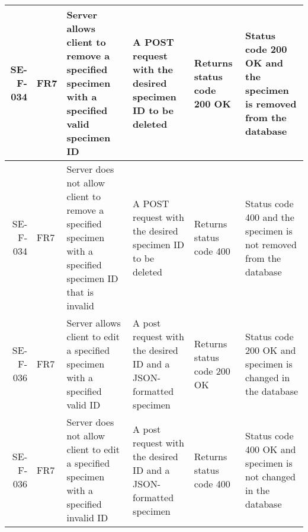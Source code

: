 \begin{landscape}
\begin{longtable}{|r|l|p{4cm}|p{4cm}|p{4cm}|p{4cm}|}
		SE-F-034 & FR7 & Server allows client to remove a specified specimen with a specified valid specimen ID &  A POST request with the desired specimen ID to be deleted &  Returns status code 200 OK &  Status code 200 OK and the specimen is removed from the database \\ \hline
		SE-F-034 & FR7 & Server does not allow client to remove a specified specimen with a specified specimen ID that is invalid&  A POST request with the desired specimen ID to be deleted &  Returns status code 400 &  Status code 400 and the specimen is not removed from the database \\ \hline
		SE-F-036 & FR7 & Server allows client to edit a specified specimen with a specified valid ID & A post request with the desired ID and a JSON-formatted specimen & Returns status code 200 OK  & Status code 200 OK and specimen is changed in the database \\ \hline
		SE-F-036 & FR7 & Server does not allow client to edit a specified specimen with a specified invalid ID & A post request with the desired ID and a JSON-formatted specimen & Returns status code 400  & Status code 400 OK and specimen is not changed in the database \\ \hline
		\end{longtable}
	\end{landscape}
